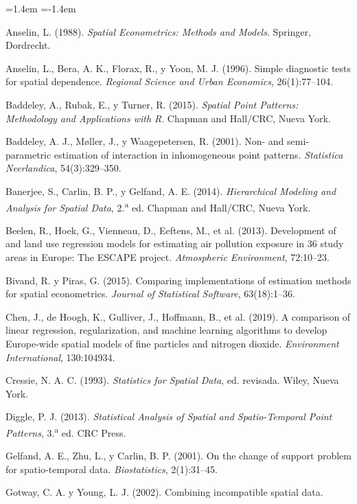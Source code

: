 \documentclass[11pt,a4paper]{article}
\begin{document}
\begin{small}
\begin{list}{}{\leftmargin=1.4em \itemindent=-1.4em \itemsep=2pt}
\item Anselin, L. (1988). \emph{Spatial Econometrics: Methods and Models}.
Springer, Dordrecht.
\item Anselin, L., Bera, A. K., Florax, R., y Yoon, M. J. (1996). Simple
diagnostic tests for spatial dependence. \emph{Regional Science and Urban
Economics}, 26(1):77--104.
\item Baddeley, A., Rubak, E., y Turner, R. (2015). \emph{Spatial Point
Patterns: Methodology and Applications with R}. Chapman and Hall/CRC, Nueva
York.
\item Baddeley, A. J., Møller, J., y Waagepetersen, R. (2001). Non- and
semi-parametric estimation of interaction in inhomogeneous point patterns.
\emph{Statistica Neerlandica}, 54(3):329--350.
\item Banerjee, S., Carlin, B. P., y Gelfand, A. E. (2014). \emph{Hierarchical
Modeling and Analysis for Spatial Data}, 2.\textsuperscript{a} ed. Chapman and
Hall/CRC, Nueva York.
\item Beelen, R., Hoek, G., Vienneau, D., Eeftens, M., et al. (2013).
Development of  and  land use regression models for estimating
air pollution exposure in 36 study areas in Europe: The ESCAPE project.
\emph{Atmospheric Environment}, 72:10--23.
\item Bivand, R. y Piras, G. (2015). Comparing implementations of estimation
methods for spatial econometrics. \emph{Journal of Statistical Software},
63(18):1--36.
\item Chen, J., de Hoogh, K., Gulliver, J., Hoffmann, B., et al. (2019). A
comparison of linear regression, regularization, and machine learning
algorithms to develop Europe-wide spatial models of fine particles and nitrogen
dioxide. \emph{Environment International}, 130:104934.
\item Cressie, N. A. C. (1993). \emph{Statistics for Spatial Data}, ed.
revisada. Wiley, Nueva York.
\item Diggle, P. J. (2013). \emph{Statistical Analysis of Spatial and
Spatio-Temporal Point Patterns}, 3.\textsuperscript{a} ed. CRC Press.
\item Gelfand, A. E., Zhu, L., y Carlin, B. P. (2001). On the change of support
problem for spatio-temporal data. \emph{Biostatistics}, 2(1):31--45.
\item Gotway, C. A. y Young, L. J. (2002). Combining incompatible spatial data.

\end{list}
\end{small}
\end{document}
